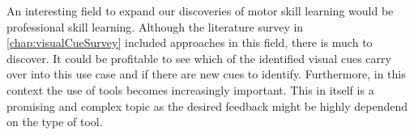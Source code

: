 An interesting field to expand our discoveries of motor skill learning would be professional skill learning.
Although the literature survey in \autoref{chap:visualCueSurvey} included approaches in this field, there is much to discover.
It could be profitable to see which of the identified visual cues carry over into this use case and if there are new cues to identify.
Furthermore, in this context the use of tools becomes increasingly important.
This in itself is a promising and complex topic as the desired feedback might be highly dependend on the type of tool.